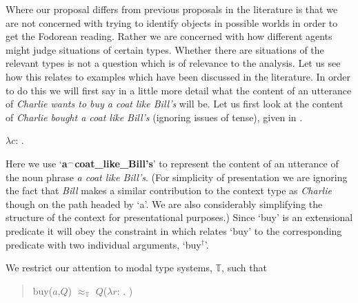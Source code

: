 Where our proposal differs from previous proposals in the literature
is that we are not concerned with trying to identify
objects in possible worlds in order to get the Fodorean reading.
Rather we are concerned with how different agents might judge
situations of certain types.  Whether there are situations of the
relevant types is not a question which is of relevance to the
analysis.  Let us see how this relates to examples which have been
discussed in the literature.  
In order to do this we will first say in a little more detail what the
content of an utterance of \textit{Charlie wants to buy a coat like
  Bill's} will be.  Let us first look at the content of
\textit{Charlie bought a coat like Bill's} (ignoring issues of tense), given in \nexteg{}.
\begin{ex}
  $\lambda c$: . 
\label{ex:contCbaclB} 
\end{ex} 
Here we use `\textbf{a$^\frown$coat\_like\_Bill's}' to represent the
  content of an utterance of the noun phrase \textit{a coat like
    Bill's}.  (For simplicity of presentation we are ignoring the fact
  that \textit{Bill} makes a similar contribution to the context type
  as \textit{Charlie} though on the path headed by `a'.  We are also
  considerably simplifying the structure of the context for
  presentational purposes.)
Since `buy' is an extensional predicate it will obey the constraint in
\nexteg{} which relates `buy' to the corresponding predicate with two
individual arguments, `buy$^\dagger$'.
\begin{ex}
  We restrict our attention to modal type systems, $\mathbb{T}$, such
  that
  \begin{quote}
buy($a$,$Q$) $\approx_{\mathbb{T}}$ $Q$($\lambda
r$:
. )
\end{quote}
\end{ex} 
